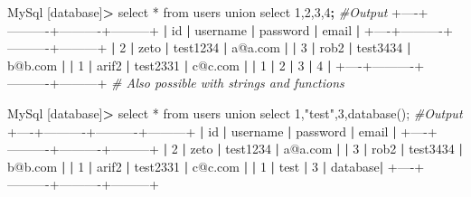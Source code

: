 \documentclass{assets/ipesethesis}
\newenvironment{Shaded}{\begin{snugshade}}{\end{snugshade}}
\newcommand{\BuiltInTok}[1]{#1}
\newcommand{\CommentTok}[1]{\textcolor[rgb]{0.56,0.35,0.01}{\textit{#1}}}
\newcommand{\ExtensionTok}[1]{#1}
\newcommand{\FunctionTok}[1]{\textcolor[rgb]{0.00,0.00,0.00}{#1}}
\newcommand{\KeywordTok}[1]{\textcolor[rgb]{0.13,0.29,0.53}{\textbf{#1}}}
\newcommand{\NormalTok}[1]{#1}
\newcommand{\OperatorTok}[1]{\textcolor[rgb]{0.81,0.36,0.00}{\textbf{#1}}}
\newcommand{\StringTok}[1]{\textcolor[rgb]{0.31,0.60,0.02}{#1}}
\begin{document}
\begin{enumerate}
\begin{Shaded}
\begin{Highlighting}[]
\ExtensionTok{MySql}\NormalTok{ [database]}\OperatorTok{>}\NormalTok{ select * from users union select 1,2,3,4}\KeywordTok{;}
\CommentTok{#Output}
\ExtensionTok{+----+----------+----------+---------+}  
\KeywordTok{|} \FunctionTok{id} \KeywordTok{|} \ExtensionTok{username} \KeywordTok{|} \ExtensionTok{password} \KeywordTok{|} \ExtensionTok{email}   \KeywordTok{|}  
\ExtensionTok{+----+----------+----------+---------+}  
\KeywordTok{|} \ExtensionTok{2}  \KeywordTok{|} \ExtensionTok{zeto}     \KeywordTok{|} \ExtensionTok{test1234} \KeywordTok{|} \ExtensionTok{a@a.com} \KeywordTok{|}  
\KeywordTok{|} \ExtensionTok{3}  \KeywordTok{|} \ExtensionTok{rob2}     \KeywordTok{|} \ExtensionTok{test3434} \KeywordTok{|} \ExtensionTok{b@b.com} \KeywordTok{|}  
\KeywordTok{|} \ExtensionTok{1}  \KeywordTok{|} \ExtensionTok{arif2}    \KeywordTok{|} \ExtensionTok{test2331} \KeywordTok{|} \ExtensionTok{c@c.com} \KeywordTok{|}  
\KeywordTok{|} \ExtensionTok{1}  \KeywordTok{|} \ExtensionTok{2}        \KeywordTok{|} \ExtensionTok{3}        \KeywordTok{|} \ExtensionTok{4}       \KeywordTok{|}  
\ExtensionTok{+----+----------+----------+---------+}  
\CommentTok{# Also possible with strings and functions}

\ExtensionTok{MySql}\NormalTok{ [database]}\OperatorTok{>}\NormalTok{ select * from users union select 1,}\StringTok{"test"}\NormalTok{,3,database();}
\CommentTok{#Output}
\ExtensionTok{+----+----------+----------+---------+}  
\KeywordTok{|} \FunctionTok{id} \KeywordTok{|} \ExtensionTok{username} \KeywordTok{|} \ExtensionTok{password} \KeywordTok{|} \ExtensionTok{email}   \KeywordTok{|}  
\ExtensionTok{+----+----------+----------+---------+}  
\KeywordTok{|} \ExtensionTok{2}  \KeywordTok{|} \ExtensionTok{zeto}     \KeywordTok{|} \ExtensionTok{test1234} \KeywordTok{|} \ExtensionTok{a@a.com} \KeywordTok{|}  
\KeywordTok{|} \ExtensionTok{3}  \KeywordTok{|} \ExtensionTok{rob2}     \KeywordTok{|} \ExtensionTok{test3434} \KeywordTok{|} \ExtensionTok{b@b.com} \KeywordTok{|}  
\KeywordTok{|} \ExtensionTok{1}  \KeywordTok{|} \ExtensionTok{arif2}    \KeywordTok{|} \ExtensionTok{test2331} \KeywordTok{|} \ExtensionTok{c@c.com} \KeywordTok{|}  
\KeywordTok{|} \ExtensionTok{1}  \KeywordTok{|} \BuiltInTok{test}     \KeywordTok{|} \ExtensionTok{3}        \KeywordTok{|} \ExtensionTok{database}\KeywordTok{|}  
\ExtensionTok{+----+----------+----------+---------+}    
\end{Highlighting}
\end{Shaded}


\end{enumerate}
\end{document}
